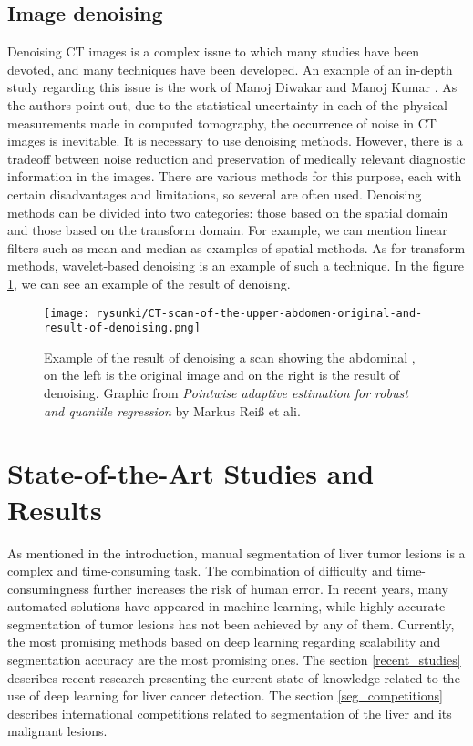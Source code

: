\subsection{Image denoising}

Denoising CT images is a complex issue to which many studies have been devoted, and many techniques have been developed. An example of an in-depth study regarding this issue is the work of Manoj Diwakar and Manoj Kumar \cite{diwakar_review_2018}. As the authors point out, due to the statistical uncertainty in each of the physical measurements made in computed tomography, the occurrence of noise in CT images is inevitable. It is necessary to use denoising methods. However, there is a tradeoff between noise reduction and preservation of medically relevant diagnostic information in the images. There are various methods for this purpose, each with certain disadvantages and limitations, so several are often used. Denoising methods can be divided into two categories: those based on the spatial domain and those based on the transform domain. For example, we can mention linear filters such as mean and median as examples of spatial methods. As for transform methods, wavelet-based denoising \cite{chen_wavelet-based_2013} is an example of such a technique. In the figure \ref{rys:denoise}, we can see an example of the result of denoisng.

\begin{figure}[!h]
	\centering \texttt{[image: rysunki/CT-scan-of-the-upper-abdomen-original-and-result-of-denoising.png]}
	\caption{Example of the result of denoising a scan showing the abdominal , on the left is the original image and on the right is the result of denoising. Graphic from \textit{Pointwise adaptive estimation for robust and quantile regression} by Markus Reiß et ali.}
	\label{rys:denoise}
\end{figure}


\section{State-of-the-Art Studies and Results}
As mentioned in the introduction, manual segmentation of liver tumor lesions is a complex and time-consuming task. The combination of difficulty and time-consumingness further increases the risk of human error. In recent years, many automated solutions have appeared in machine learning, while highly accurate segmentation of tumor lesions has not been achieved by any of them. Currently, the most promising methods based on deep learning regarding scalability and segmentation accuracy are the most promising ones. The section \ref{recent_studies} describes recent research presenting the current state of knowledge related to the use of deep learning for liver cancer detection. The section \ref{seg_competitions} describes international competitions related to segmentation of the liver and its malignant lesions.




